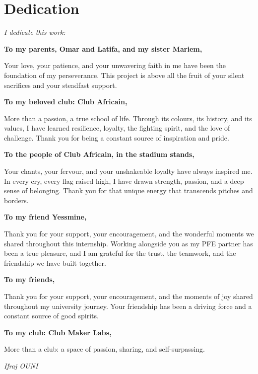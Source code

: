 \chapter*{Dedication}

\begin{center}
\textit{I dedicate this work:}
\end{center}
\begin{center}\textbf{To my parents, Omar and Latifa, and my sister Mariem,}\end{center}
Your love, your patience, and your unwavering faith in me have been the foundation
of my perseverance. This project is above all the fruit of your silent sacrifices
and your steadfast support.
\bigskip
\begin{center}\textbf{To my beloved club: Club Africain,}\end{center}
More than a passion, a true school of life. Through its colours, its history, and
its values, I have learned resilience, loyalty, the fighting spirit, and the love
of challenge. Thank you for being a constant source of inspiration and pride.
\bigskip
\begin{center}\textbf{To the people of Club Africain, in the stadium stands,}\end{center}
Your chants, your fervour, and your unshakeable loyalty have always inspired me.
In every cry, every flag raised high, I have drawn strength, passion, and a deep
sense of belonging. Thank you for that unique energy that transcends pitches and
borders.
\bigskip
\begin{center}\textbf{To my friend Yessmine,}\end{center}
Thank you for your support, your encouragement, and the wonderful moments we shared
throughout this internship. Working alongside you as my PFE partner has been a true
pleasure, and I am grateful for the trust, the teamwork, and the friendship we have
built together.
\bigskip
\begin{center}\textbf{To my friends,}\end{center}
Thank you for your support, your encouragement, and the moments of joy shared
throughout my university journey. Your friendship has been a driving force and a
constant source of good spirits.
\bigskip
\begin{center}\textbf{To my club: Club Maker Labs,}\end{center}
More than a club: a space of passion, sharing, and self-surpassing.

\vfill
\begin{flushright}
\textit{Ifraj OUNI}
\end{flushright}